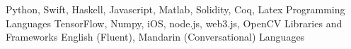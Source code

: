 \begin{cventries}
  \cvsmallentry
    {Python, Swift, Haskell, Javascript, Matlab, Solidity, Coq, Latex}
    {Programming Languages}
    {}
    {}
    {}
  \cvsmallentry
    {TensorFlow, Numpy, iOS, node.js, web3.js, OpenCV}
    {Libraries and Frameworks}
    {}
    {}
    {}
  \cvsmallentry
    {English (Fluent), Mandarin (Conversational)}
    {Languages}
    {}
    {}
    {}
\end{cventries}


